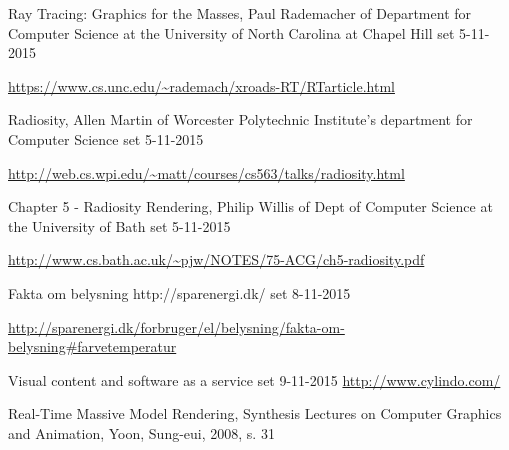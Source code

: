 \begin{thebibliography}{99}
  Ray Tracing: Graphics for the Masses, 
  Paul Rademacher of Department for Computer Science at the University of North Carolina at Chapel Hill
  set 5-11-2015

  \url{https://www.cs.unc.edu/~rademach/xroads-RT/RTarticle.html}

  Radiosity,
  Allen Martin of Worcester Polytechnic Institute's department for Computer Science
  set 5-11-2015

  \url{http://web.cs.wpi.edu/~matt/courses/cs563/talks/radiosity.html}

  Chapter 5 - Radiosity Rendering,
  Philip Willis of Dept of Computer Science at the University of Bath
  set 5-11-2015

  \url{http://www.cs.bath.ac.uk/~pjw/NOTES/75-ACG/ch5-radiosity.pdf}
  
  Fakta om belysning
  http://sparenergi.dk/
  set 8-11-2015
  
  \url{http://sparenergi.dk/forbruger/el/belysning/fakta-om-belysning#farvetemperatur}

  Visual content and software as a service
  set 9-11-2015
  \url{http://www.cylindo.com/}

  Real-Time Massive Model Rendering,
  Synthesis Lectures on Computer Graphics and Animation,
  Yoon, Sung-eui, 2008,
  s. 31

\end{thebibliography}
\clearpage